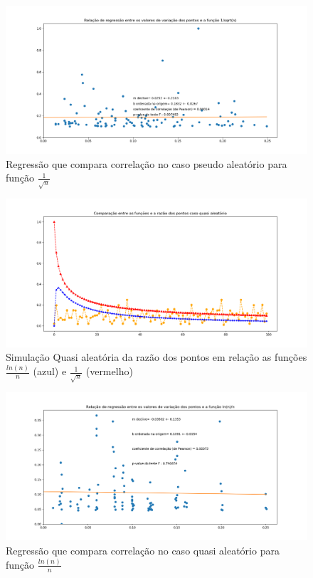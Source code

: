\documentclass[a4paper, 12pt]{article}
\begin{document}
    
  \begin{figure}[h]
  \centering
  \includegraphics[scale=0.40]{reg1sqrtpseudo.png}
  \caption{Regressão que compara correlação  no caso pseudo aleatório para função  $\frac{1}{\sqrt{n}}$}
  \label{figura:reg1sqrtpseudo}
  \end{figure}
    
  \begin{figure}[h]
  \centering
  \includegraphics[scale=0.40]{graficospontosquasi.png}
  \caption{Simulação Quasi aleatória  da razão dos pontos em relação as funções  $\frac{ln(n)}{n}$ (azul) e $\frac{1}{\sqrt{n}}$ (vermelho)}
  \label{figura:graficospontosquasi}
  \end{figure}
 
  
  \begin{figure}[h]
  \centering
  \includegraphics[scale=0.40]{regrecaoln.png}
  \caption{Regressão que compara correlação no caso quasi aleatório para função $\frac{ln(n)}{n}$}
  \label{figura:regrecaoln}
  \end{figure}
  
\end{document}
